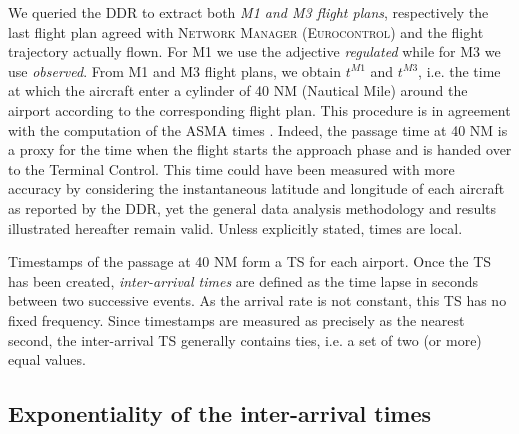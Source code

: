 \documentclass[]{elsarticle}
\makeatletter
\newcommand*{\ie}{i.e.\@\xspace}
\makeatother
\begin{document}
We queried the \ac{DDR} to extract both \emph{M1 and M3 flight plans}, respectively the last flight plan agreed with \textsc{Network Manager} (\textsc{Eurocontrol}) and the flight trajectory actually flown.
For M1 we use the adjective \emph{regulated} while for M3 we use \emph{observed}.
From M1 and M3 flight plans, we obtain \(t^{M1}\) and \(t^{M3}\), \ie{} the time at which the aircraft enter a cylinder of 40 NM (Nautical Mile) around the airport according to the corresponding flight plan.
This procedure is in agreement with the computation of the ASMA times \citep{ASMA-def}.
Indeed, the passage time at 40 NM is a proxy for the time when the flight starts the approach phase and is handed over to the Terminal Control.
This time could have been measured with more accuracy by considering the instantaneous latitude and longitude of each aircraft as reported by the \ac{DDR}, yet the general data analysis methodology and results illustrated hereafter remain valid.
Unless explicitly stated, times are local.

Timestamps of the passage at 40 NM form a \ac{TS} for each airport.
Once the \ac{TS} has been created, \emph{inter-arrival times} are defined as the time lapse in seconds between two successive events. As the arrival rate is not constant, this \ac{TS} has no fixed frequency.
Since timestamps are measured as precisely as the nearest second, the inter-arrival \ac{TS} generally contains ties, \ie{} a set of two (or more) equal values.

\subsection{Exponentiality of the inter-arrival times}\label{sec:dm_exp}
\end{document}
